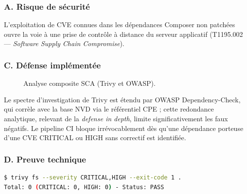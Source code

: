 \subsubsection{A. Risque de sécurité}
L'exploitation de CVE connues dans les dépendances Composer non patchées ouvre la voie à une prise de contrôle à distance du serveur applicatif (T1195.002 — \textit{Software Supply Chain Compromise}).

\subsubsection{C. Défense implémentée}

\begin{figure}[H]
\centering
\scriptsize
{}
\caption{Analyse composite SCA (Trivy et OWASP).}
\end{figure}

Le spectre d'investigation de Trivy est étendu par OWASP Dependency-Check, qui corrèle avec la base NVD via le référentiel CPE ; cette redondance analytique, relevant de la \textit{defense in depth}, limite significativement les faux négatifs. Le pipeline CI bloque irrévocablement dès qu'une dépendance porteuse d'une CVE CRITICAL ou HIGH sans correctif est identifiée.

\subsubsection{D. Preuve technique}
\begin{lstlisting}[language=bash, caption={Sortie du scan SCA Trivy FS}, label={lst:sca_proof_layer}]
$ trivy fs --severity CRITICAL,HIGH --exit-code 1 .
Total: 0 (CRITICAL: 0, HIGH: 0) - Status: PASS
\end{lstlisting}

